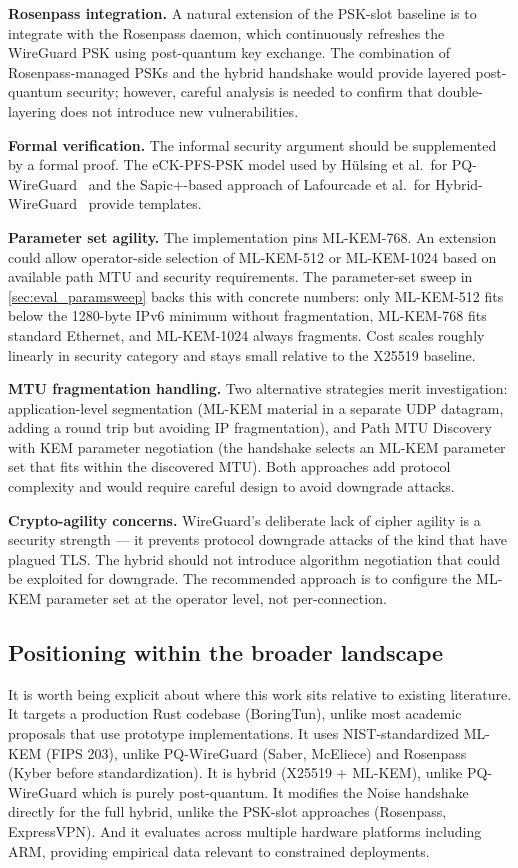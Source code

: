 \documentclass[11pt,a4paper]{article}
\begin{document}
\textbf{Rosenpass integration.} A natural extension of the PSK-slot baseline is to integrate with the Rosenpass daemon, which continuously refreshes the WireGuard PSK using post-quantum key exchange. The combination of Rosenpass-managed PSKs and the hybrid handshake would provide layered post-quantum security; however, careful analysis is needed to confirm that double-layering does not introduce new vulnerabilities.

\textbf{Formal verification.} The informal security argument should be supplemented by a formal proof. The eCK-PFS-PSK model used by H\"ulsing et al.\ for PQ-WireGuard~\cite{hulsing2021pqwireguard} and the Sapic+-based approach of Lafourcade et al.\ for Hybrid-WireGuard~\cite{lafourcade2025hybrid} provide templates.

\textbf{Parameter set agility.} The implementation pins ML-KEM-768. An extension could allow operator-side selection of ML-KEM-512 or ML-KEM-1024 based on available path MTU and security requirements. The parameter-set sweep in \cref{sec:eval_paramsweep} backs this with concrete numbers: only ML-KEM-512 fits below the 1280-byte IPv6 minimum without fragmentation, ML-KEM-768 fits standard Ethernet, and ML-KEM-1024 always fragments. Cost scales roughly linearly in security category and stays small relative to the X25519 baseline.

\textbf{MTU fragmentation handling.} Two alternative strategies merit investigation: application-level segmentation (ML-KEM material in a separate UDP datagram, adding a round trip but avoiding IP fragmentation), and Path MTU Discovery with KEM parameter negotiation (the handshake selects an ML-KEM parameter set that fits within the discovered MTU). Both approaches add protocol complexity and would require careful design to avoid downgrade attacks.

\textbf{Crypto-agility concerns.} WireGuard's deliberate lack of cipher agility is a security strength --- it prevents protocol downgrade attacks of the kind that have plagued TLS. The hybrid should not introduce algorithm negotiation that could be exploited for downgrade. The recommended approach is to configure the ML-KEM parameter set at the operator level, not per-connection.

\subsection{Positioning within the broader landscape}

It is worth being explicit about where this work sits relative to existing literature. It targets a production Rust codebase (BoringTun), unlike most academic proposals that use prototype implementations. It uses NIST-standardized ML-KEM (FIPS 203), unlike PQ-WireGuard (Saber, McEliece) and Rosenpass (Kyber before standardization). It is hybrid (X25519 + ML-KEM), unlike PQ-WireGuard which is purely post-quantum. It modifies the Noise handshake directly for the full hybrid, unlike the PSK-slot approaches (Rosenpass, ExpressVPN). And it evaluates across multiple hardware platforms including ARM, providing empirical data relevant to constrained deployments.
\end{document}

